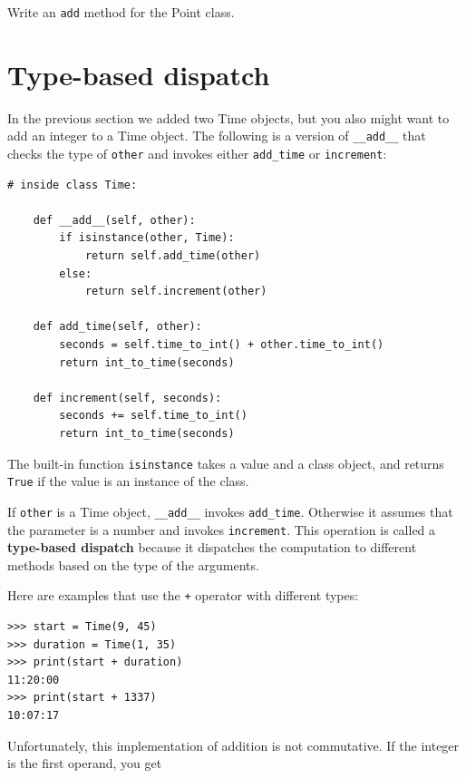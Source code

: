 \documentclass[10pt]{book}
\begin{document}
\begin{ex}
Write an {\tt add} method for the Point class.  
\end{ex}


\section{Type-based dispatch}

In the previous section we added two Time objects, but you
also might want to add an integer to a Time object.  The
following is a version of \verb"__add__"
that checks the type of {\tt other} and invokes either
\verb"add_time" or {\tt increment}:

\beforeverb
\begin{verbatim}
# inside class Time:

    def __add__(self, other):
        if isinstance(other, Time):
            return self.add_time(other)
        else:
            return self.increment(other)

    def add_time(self, other):
        seconds = self.time_to_int() + other.time_to_int()
        return int_to_time(seconds)

    def increment(self, seconds):
        seconds += self.time_to_int()
        return int_to_time(seconds)
\end{verbatim}
\afterverb
%
The built-in function {\tt isinstance} takes a value and a
class object, and returns {\tt True} if the value is an instance
of the class.


If {\tt other} is a Time object, \verb"__add__" invokes
\verb"add_time".  Otherwise it assumes that the parameter
is a number and invokes {\tt increment}.  This operation is
called a {\bf type-based dispatch} because it dispatches the
computation to different methods based on the type of the
arguments.


Here are examples that use the {\tt +} operator with different
types:

\beforeverb
\begin{verbatim}
>>> start = Time(9, 45)
>>> duration = Time(1, 35)
>>> print(start + duration)
11:20:00
>>> print(start + 1337)
10:07:17
\end{verbatim}
\afterverb
%
Unfortunately, this implementation of addition is not commutative.
If the integer is the first operand, you get
\end{document}
